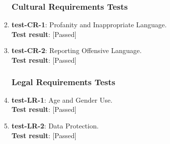\documentclass[12pt, titlepage]{article}
\begin{document}
\begin{enumerate}
\subsubsection{Cultural Requirements Tests}
	\item{\textbf{test-CR-1}}: Profanity and Inappropriate Language.\\
	\textbf{Test result}: [Passed]
	
	\item{\textbf{test-CR-2}}: Reporting Offensive Language.\\
	\textbf{Test result}: [Passed]
	
\subsubsection{Legal Requirements Tests}
	\item{\textbf{test-LR-1}}: Age and Gender Use.\\
	\textbf{Test result}: [Passed]
	
	\item{\textbf{test-LR-2}}: Data Protection.\\
	\textbf{Test result}: [Passed]
	
\end{enumerate}
\end{document}
